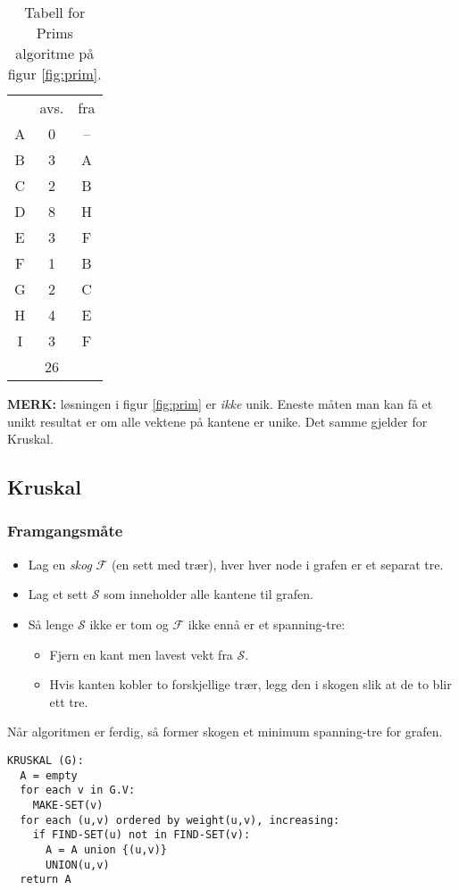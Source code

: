 \documentclass[11pt,a4paper]{article}
\theoremstyle{def}
\begin{document}
\begin{table}
\centering
\begin{tabular}{ccc}
&avs.&fra\\
A&0&--\\
B&3&A\\
C&2&B\\
D&8&H\\
E&3&F\\
F&1&B\\
G&2&C\\
H&4&E\\
I&3&F\\
\cline{2-2}
&26&\\
\cline{2-2}
\end{tabular}
\caption{Tabell for Prims algoritme på figur \ref{fig:prim}.}
\end{table}

\textbf{MERK:} løsningen i figur \ref{fig:prim} er \textit{ikke} unik. Eneste måten man kan få et unikt resultat er om alle vektene på kantene er unike. Det samme gjelder for Kruskal.

\subsection{Kruskal}
\subsubsection{Framgangsmåte}
\begin{itemize}
\item
Lag en \textit{skog} $\mathcal{F}$ (en sett med trær), hver hver node i grafen er et separat tre.
\item
Lag et sett $\mathcal{S}$ som inneholder alle kantene til grafen.
\item
Så lenge $\mathcal{S}$ ikke er tom og $\mathcal{F}$ ikke ennå er et spanning-tre:
\begin{itemize}
\item
Fjern en kant men lavest vekt fra $\mathcal{S}$.
\item
Hvis kanten kobler to forskjellige trær, legg den i skogen slik at de to blir ett tre.
\end{itemize}
\end{itemize}
Når algoritmen er ferdig, så former skogen et minimum spanning-tre for grafen. 

\begin{Verbatim}[frame=single]
KRUSKAL (G):
  A = empty
  for each v in G.V:
    MAKE-SET(v)
  for each (u,v) ordered by weight(u,v), increasing:
    if FIND-SET(u) not in FIND-SET(v):
      A = A union {(u,v)}
      UNION(u,v)
  return A
\end{Verbatim}
\end{document}
